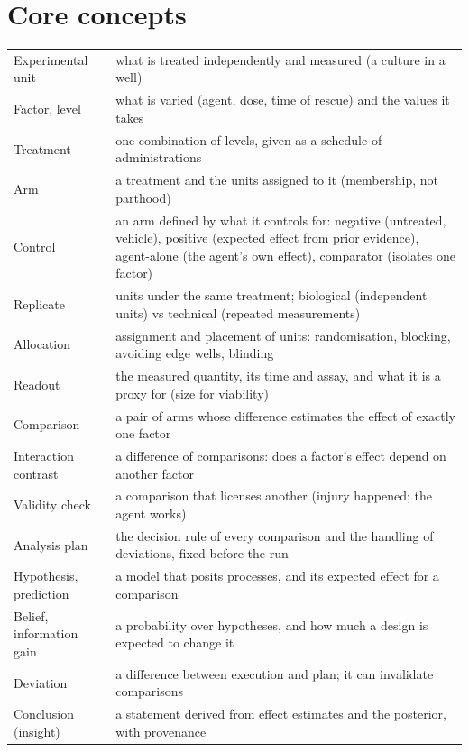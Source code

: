 \documentclass[10pt,a4paper]{article}
\begin{document}
\section*{Core concepts}
{\small\begin{tabularx}{\linewidth}{@{}>{\raggedright\arraybackslash}p{3.1cm}>{\raggedright\arraybackslash}X@{}}\toprule
Experimental unit & what is treated independently and measured (a culture in a well) \\
Factor, level & what is varied (agent, dose, time of rescue) and the values it takes \\
Treatment & one combination of levels, given as a schedule of administrations \\
Arm & a treatment and the units assigned to it (membership, not parthood) \\
Control & an arm defined by what it controls for: negative (untreated, vehicle), positive (expected effect from prior
evidence), agent-alone (the agent's own effect), comparator (isolates one factor) \\
Replicate & units under the same treatment; biological (independent units) vs technical (repeated measurements) \\
Allocation & assignment and placement of units: randomisation, blocking, avoiding edge wells, blinding \\
Readout & the measured quantity, its time and assay, and what it is a proxy for (size for viability) \\
Comparison & a pair of arms whose difference estimates the effect of exactly one factor \\
Interaction contrast & a difference of comparisons: does a factor's effect depend on another factor \\
Validity check & a comparison that licenses another (injury happened; the agent works) \\
Analysis plan & the decision rule of every comparison and the handling of deviations, fixed before the run \\
Hypothesis, prediction & a model that posits processes, and its expected effect for a comparison \\
Belief, information gain & a probability over hypotheses, and how much a design is expected to change it \\
Deviation & a difference between execution and plan; it can invalidate comparisons \\
Conclusion (insight) & a statement derived from effect estimates and the posterior, with provenance \\
\bottomrule\end{tabularx}}
\end{document}

